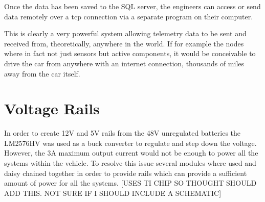 \documentclass[10pt,a4paper]{article}
\begin{document}
Once the data has been saved to the SQL server, the engineers can access or send data remotely over a tcp connection via a separate program on their computer.

This is clearly a very powerful system allowing telemetry data to be sent and received from, theoretically,  anywhere in the world. If for example the nodes where in fact not just sensors but active components, it would be conceivable to drive the car from anywhere with an internet connection, thousands of miles away from the car itself.

\section{Voltage Rails}
In order to create 12V and 5V rails from the 48V unregulated batteries the LM2576HV was used as a buck converter to regulate and step down the voltage. However, the 3A maximum output current would not be enough to power all the systems within the vehicle. To resolve this issue several modules where used and daisy chained together in order to provide rails which can provide a sufficient amount of power for all the systems. [USES TI CHIP SO THOUGHT SHOULD ADD THIS. NOT SURE IF I SHOULD INCLUDE A SCHEMATIC] 
\end{document}
